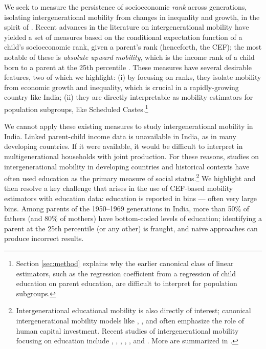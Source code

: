 \documentclass[12pt,letterpaper]{article}
\numberwithin{equation}{section}
\begin{document}
We seek to measure the persistence of socioeconomic \textit{rank} across generations, isolating intergenerational mobility from changes in inequality and growth, in the spirit of . Recent advances in the literature on intergenerational mobility have yielded a set of measures based on the conditional expectation function of a child's socioeconomic rank, given a parent's rank (henceforth, the CEF); the most notable of these is \textit{absolute upward mobility}, which is the income rank of a child born to a parent at the 25th percentile \cite{chetty2014c}. These measures have several desirable features, two of which we highlight: (i) by focusing on ranks, they isolate mobility from economic growth and inequality, which is crucial in a rapidly-growing country like India; (ii) they are directly interpretable as mobility estimators for population subgroups, like Scheduled Castes.\footnote{Section \ref{sec:method} explains why the earlier canonical class of linear estimators, such as the regression coefficient from a regression of child education on parent education, are difficult to interpret for population subgroups.}

We cannot apply these existing measures to study intergenerational mobility in India. Linked parent-child income data is unavailable in India, as in many developing countries. If it were available, it would be difficult to interpret in multigenerational households with joint production. For these reasons, studies on intergenerational mobility in developing countries and historical contexts have often used education as the primary measure of social status.\footnote{Intergenerational educational mobility is also directly of interest; canonical intergenerational mobility models like , , and  often emphasize the role of human capital investment. Recent studies of intergenerational mobility focusing on education include , , , , , and . More are summarized in .} We highlight and then resolve a key challenge that arises in the use of CEF-based mobility estimators with education data: education is reported in bins --- often very large bins. Among parents of the 1950--1969 generations in India, more than 50\% of fathers (and 80\% of mothers) have bottom-coded levels of education; identifying a parent at the 25th percentile (or any other) is fraught, and naive approaches can produce incorrect results.
\end{document}
